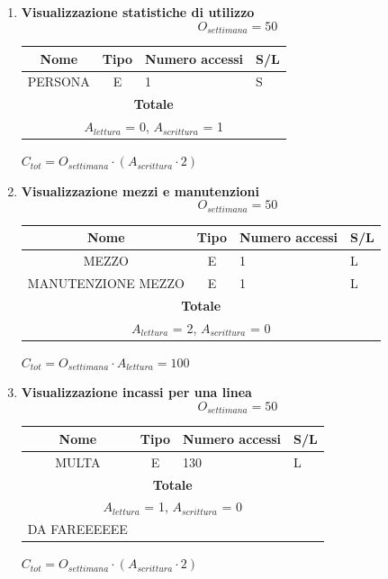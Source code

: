\documentclass[12pt,a4paper]{report}
\begin{document}
\begin{enumerate}[label=\textbf{\arabic*)}]
    \item \textbf{Visualizzazione statistiche di utilizzo} \\
    \[ {O_{settimana} = 50} \]
    \begin{table}[H]
    \centering
    \begin{tabular}{|c|c|l|l|}
    \hline
    \textbf{Nome} & \textbf{Tipo} & \textbf{Numero accessi} & \textbf{S/L} \\
    \hline
    PERSONA & E & 1 & S \\
    \hline
    \multicolumn{4}{c}{\textbf{Totale}} \\    
    \multicolumn{4}{c}{${A_{lettura}}$ = 0, ${A_{scrittura}}$ = 1} \\
    \hline
    \end{tabular}
    \end{table}
    \begin{center}
    ${C_{tot} = {O_{settimana}}\cdot({A_{scrittura}}\cdot 2)}$
    \end{center}

    \item \textbf{Visualizzazione mezzi e manutenzioni} \\
    \[ {O_{settimana} = 50} \]
    \begin{table}[H]
    \centering
    \begin{tabular}{|c|c|l|l|}
    \hline
    \textbf{Nome} & \textbf{Tipo} & \textbf{Numero accessi} & \textbf{S/L} \\
    \hline
    MEZZO & E & 1 & L \\
    \hline
    MANUTENZIONE MEZZO & E & 1 & L \\
    \hline
    \multicolumn{4}{c}{\textbf{Totale}} \\    
    \multicolumn{4}{c}{${A_{lettura}}$ = 2, ${A_{scrittura}}$ = 0} \\
    \hline
    \end{tabular}
    \end{table}
    \begin{center}
    ${C_{tot} = {O_{settimana}}\cdot{A_{lettura}} = 100}$
    \end{center}

    \item \textbf{Visualizzazione incassi per una linea} \\
    \[ {O_{settimana} = 50} \]
    \begin{table}[H]
    \centering
    \begin{tabular}{|c|c|l|l|}
    \hline
    \textbf{Nome} & \textbf{Tipo} & \textbf{Numero accessi} & \textbf{S/L} \\
    \hline
    MULTA & E & 130 & L \\
    \hline
    \multicolumn{4}{c}{\textbf{Totale}} \\    
    \multicolumn{4}{c}{${A_{lettura}}$ = 1, ${A_{scrittura}}$ = 0} \\
    \hline
    DA FAREEEEEE
    \end{tabular}
    \end{table}
    \begin{center}
    ${C_{tot} = {O_{settimana}}\cdot({A_{scrittura}}\cdot 2)}$
    \end{center}


\end{enumerate}
\end{document}
